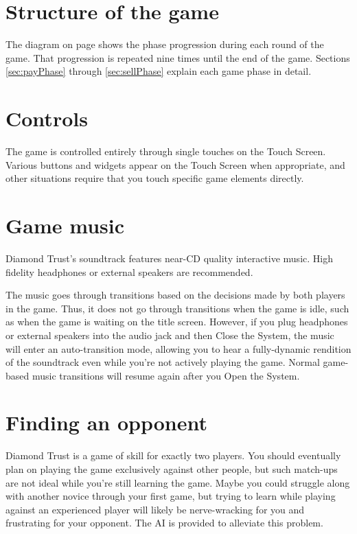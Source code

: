 \documentclass[8pt]{extbook}
\begin{document}
\section{Structure of the game}

The diagram on page \pageref{fig:gameFlow} shows the phase progression during each round of the game.  That progression is repeated nine times until the end of the game.  Sections \ref{sec:payPhase} through \ref{sec:sellPhase} explain each game phase in detail.











\section{Controls}
The game is controlled entirely through single touches on the Touch Screen.  Various buttons and widgets appear on the Touch Screen when appropriate, and other situations require that you touch specific game elements directly.

\section{Game music}

Diamond Trust's soundtrack features near-CD quality interactive music.  High fidelity headphones or external speakers are recommended.  

The music goes through transitions based on the decisions made by both players in the game.  Thus, it does not go through transitions when the game is idle, such as when the game is waiting on the title screen.  However, if you plug headphones or external speakers into the audio jack and then Close the System, the music will enter an auto-transition mode, allowing you to hear a fully-dynamic rendition of the soundtrack even while you're not actively playing the game.  Normal game-based music transitions will resume again after you Open the System.

\section{Finding an opponent}

Diamond Trust is a game of skill for exactly two players.  You should eventually plan on playing the game exclusively against other people, but such match-ups are not ideal while you're still learning the game.  Maybe you could struggle along with another novice through your first game, but trying to learn while playing against an experienced player will likely be nerve-wracking for you and frustrating for your opponent.  The AI is provided to alleviate this problem.
\end{document}
